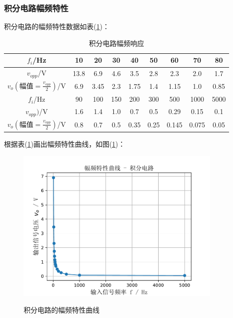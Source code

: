 \documentclass[a4paper]{article}
\begin{document}
\subsubsection{积分电路幅频特性}
积分电路的幅频特性数据如表(\ref{int_AFC_table})：
\begin{table}[!h]
\centering
\caption{积分电路幅频响应}
\label{int_AFC_table}
\begin{tabular}{|c|c|c|c|c|c|c|c|c|}
\hline
\rowcolor[HTML]{EFEFEF} 
$f_i$/Hz                     & 10   & 20   & 30  & 40   & 50   & 60    & 70    & 80   \\ \hline
$v_{opp}$/V              & 13.8 & 6.9  & 4.6 & 3.5  & 2.8  & 2.3   & 2.0   & 1.7  \\ \hline
$v_o(\text{幅值}=\frac{v_{opp}}{2})$/V & 6.9  & 3.45 & 2.3 & 1.75 & 1.4  & 1.15  & 1.0   & 0.85 \\ \hline
\rowcolor[HTML]{EFEFEF} 
$f_i$/Hz                     & 90   & 100  & 150 & 200  & 300  & 500   & 1000  & 5000 \\ \hline
$v_{opp})$/V              & 1.6  & 1.4  & 1.0 & 0.7  & 0.5  & 0.29  & 0.15  & 0.1  \\ \hline
$v_o(\text{幅值}=\frac{v_{opp}}{2})$/V & 0.8  & 0.7  & 0.5 & 0.35 & 0.25 & 0.145 & 0.075 & 0.05 \\ \hline
\end{tabular}
\end{table}

根据表(\ref{int_AFC_table})画出幅频特性曲线，如图(\ref{AFC_int_fig})：
\begin{figure}[!h]
\centering
\includegraphics[width=10cm]{fig/AFC_int.pdf}\\
\caption{积分电路的幅频特性曲线}\label{AFC_int_fig}
\end{figure}
\end{document}
